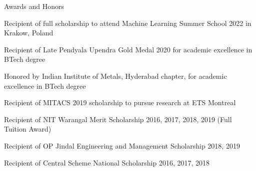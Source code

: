 \documentclass{resume} %
\begin{document}





\begin{rSection}{Awards and Honors} \itemsep -3pt
\item Recipient of full scholarship to attend Machine Learning Summer School 2022 in Krakow, Poland
\item Recipient of Late Pendyala Upendra Gold Medal 2020 for academic excellence in BTech degree
\item Honored by Indian Institute of Metals, Hyderabad chapter, for academic excellence in BTech degree
\item Recipient of MITACS 2019 scholarship to pursue research at ETS Montreal \hfill 
\item Recipient of NIT Warangal Merit Scholarship 2016, 2017, 2018, 2019 (Full Tuition Award)
\item Recipient of OP Jindal Engineering and Management Scholarship 2018, 2019 \hfill 
\item Recipient of Central Scheme National Scholarship 2016, 2017, 2018 \hfill 


\end{rSection}




\end{document}
